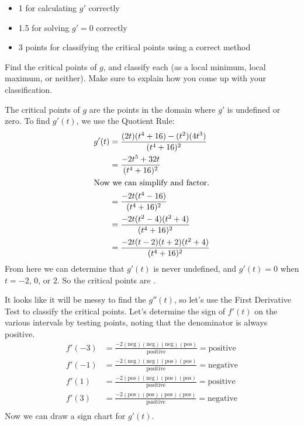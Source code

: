 \documentclass{article}
\begin{document}
\begin{enumerate}
\begin{enumerate}
    \begin{grading}
      \begin{itemize}[nosep]
      \item 1 for calculating $g'$ correctly
      \item 1.5 for solving $g' = 0$ correctly 
      \item 3 points for classifying the critical points using a correct method 
      \end{itemize}
    \end{grading}

    \begin{problem}[\stretch{3}]
      Find the critical points of $g$, and classify each (as a local minimum, local maximum, or neither). Make sure to explain how you come up with your classification. 
    \end{problem}

    \begin{solution}
      The critical points of $g$ are the points in the domain where $g'$ is
      undefined or zero. To find $g'(t)$, we use the Quotient Rule:
      \begin{align*}
        g'(t) &= \frac{(2t)(t^4+16)-(t^2)(4t^3)}{(t^4+16)^2} \\
        &= \frac{-2t^5+32t}{(t^4+16)^2} \\
        \intertext{Now we can simplify and factor.}
        &= \frac{-2t(t^4-16)}{(t^4+16)^2}\\
        &= \frac{-2t(t^2-4)(t^2+4)}{(t^4+16)^2} \\
        &= \frac{-2t(t-2)(t+2)(t^2+4)}{(t^4+16)^2}
      \end{align*}
      From here we can determine that $g'(t)$ is never undefined, and
      $g'(t)=0$ when $t=-2$, $0$, or $2$. So the critical points are
      .

      It looks like it will be messy to find the $g''(t)$,
      so let's use the First Derivative Test to classify the critical points.
      Let's determine the sign of $f'(t)$ on the various intervals by testing points,
      noting that the denominator is always positive.
      \begin{align*}
        f'(-3) &= \frac{-2(\text{neg})(\text{neg})(\text{neg})(\text{pos})}{\text{positive}}
          = \text{positive} \\
        f'(-1) &= \frac{-2(\text{neg})(\text{neg})(\text{pos})(\text{pos})}{\text{positive}}
          = \text{negative} \\
        f'(1) &= \frac{-2(\text{pos})(\text{neg})(\text{pos})(\text{pos})}{\text{positive}}
          = \text{positive} \\
        f'(3) &= \frac{-2(\text{pos})(\text{pos})(\text{pos})(\text{pos})}{\text{positive}}
          = \text{negative} \\
      \end{align*}
      Now we can draw a sign chart for $g'(t)$. 


\end{solution}
\end{enumerate}
\end{enumerate}
\end{document}
